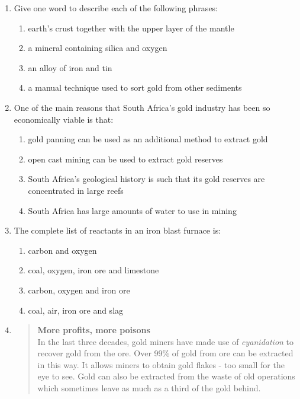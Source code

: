 \begin{eocexercises}{}
\begin{enumerate}
\item{Give one word to describe each of the following phrases:}
\begin{enumerate}
\item{earth's crust together with the upper layer of the mantle}
\item{a mineral containing silica and oxygen}
\item{an alloy of iron and tin}
\item{a manual technique used to sort gold from other sediments}
\end{enumerate}

\item{One of the main reasons that South Africa's gold industry has been so economically viable is that:}
\begin{enumerate}
\item{gold panning can be used as an additional method to extract gold}
\item{open cast mining can be used to extract gold reserves}
\item{South Africa's geological history is such that its gold reserves are concentrated in large reefs}
\item{South Africa has large amounts of water to use in mining}
\end{enumerate}

\item{The complete list of reactants in an iron blast furnace is:}
\begin{enumerate}
\item{carbon and oxygen}
\item{coal, oxygen, iron ore and limestone}
\item{carbon, oxygen and iron ore}
\item{coal, air, iron ore and slag}
\end{enumerate}

\item{\begin{quote}{
\textbf{More profits, more poisons}\\

In the last three decades, gold miners have made use of \textit{cyanidation} to recover gold from the ore. Over 99\% of gold from ore can be extracted in this way. It allows miners to obtain gold flakes - too small for the eye to see. Gold can also be extracted from the waste of old operations which sometimes leave as much as a third of the gold behind.\\

}
\end{quote}}
\end{enumerate}
\end{eocexercises}
